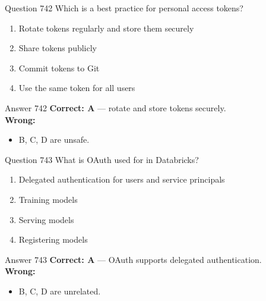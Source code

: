\documentclass[aspectratio=169,11pt]{beamer}
\begin{document}
	\begin{frame}{Question 742}
		Which is a best practice for personal access tokens?
		\begin{enumerate}[label=\Alph*.]
			\item Rotate tokens regularly and store them securely
			\item Share tokens publicly
			\item Commit tokens to Git
			\item Use the same token for all users
		\end{enumerate}
	\end{frame}
	\begin{frame}{Answer 742}
		\textbf{Correct: A} --- rotate and store tokens securely.\\
		\vspace{0.5em}
		\textbf{Wrong:}
		\begin{itemize}
			\item B, C, D are unsafe.
		\end{itemize}
	\end{frame}
	
	\begin{frame}{Question 743}
		What is OAuth used for in Databricks?
		\begin{enumerate}[label=\Alph*.]
			\item Delegated authentication for users and service principals
			\item Training models
			\item Serving models
			\item Registering models
		\end{enumerate}
	\end{frame}
	\begin{frame}{Answer 743}
		\textbf{Correct: A} --- OAuth supports delegated authentication.\\
		\vspace{0.5em}
		\textbf{Wrong:}
		\begin{itemize}
			\item B, C, D are unrelated.
		\end{itemize}
	\end{frame}
	
\end{document}
